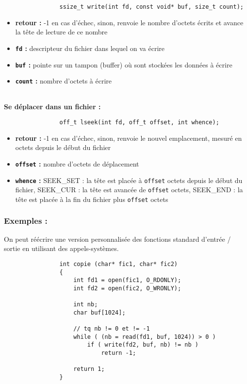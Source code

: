 			\begin{lstlisting}
				ssize_t write(int fd, const void* buf, size_t count);
			\end{lstlisting}
			\begin{itemize}
				\item \textbf{retour :} -1 en cas d'échec, sinon, renvoie le nombre d'octets écrits et avance la tête de lecture de ce nombre
				\item \textbf{\lstinline!fd! :} descripteur du fichier dans lequel on va écrire
				\item \textbf{\lstinline!buf! :} pointe sur un tampon (buffer) où sont stockées les données à écrire 
				\item \textbf{\lstinline!count! :} nombre d'octets à écrire
			\end{itemize}
			
		~\\\textbf{Se déplacer dans un fichier :}\hspace*{-2em}
			\begin{lstlisting}
				off_t lseek(int fd, off_t offset, int whence);
			\end{lstlisting}
			\begin{itemize}
				\item \textbf{retour :} -1 en cas d'échec, sinon, renvoie le nouvel emplacement, mesuré en octets depuis le début du fichier
				\item \textbf{\lstinline!offset! :} nombre d'octets de déplacement 
				\item \textbf{\lstinline!whence! :} SEEK\_SET : la tête est placée à \lstinline!offset! octets depuis le début du fichier, SEEK\_CUR : la tête est avancée de \lstinline!offset! octets, SEEK\_END : la tête est placée à la fin du fichier plus \lstinline!offset! octets
			\end{itemize}
			
		\subsubsection*{Exemples :}
			On peut réécrire une version personnalisée des fonctions standard d'entrée / sortie en utilisant des appels-systèmes.
			
			\begin{lstlisting}
				int copie (char* fic1, char* fic2) 
				{
					int fd1 = open(fic1, O_RDONLY);
					int fd2 = open(fic2, O_WRONLY);
					
					int nb;
					char buf[1024];
					
					// tq nb != 0 et != -1
					while ( (nb = read(fd1, buf, 1024)) > 0 )
						if ( write(fd2, buf, nb) != nb )
							return -1;
							
					return 1;
				}
			\end{lstlisting}
		
